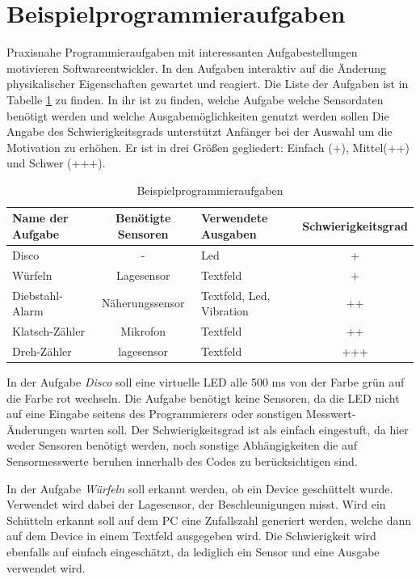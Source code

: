 \documentclass[11pt,a4paper]{report}
\begin{document}
\section{Beispielprogrammieraufgaben}\label{sec:activities}
Praxisnahe Programmieraufgaben mit interessanten Aufgabestellungen motivieren Softwareentwickler.
In den Aufgaben interaktiv auf die Änderung physikalischer Eigenschaften gewartet und reagiert.
Die Liste der Aufgaben ist in Tabelle \ref{tab:excercises} zu finden.
In ihr ist zu finden, welche Aufgabe welche Sensordaten benötigt werden und welche Ausgabemöglichkeiten genutzt werden sollen
Die Angabe des Schwierigkeitsgrads unterstützt Anfänger bei der Auswahl um die Motivation zu erhöhen.
Er ist in drei Größen gegliedert:
Einfach (+), Mittel(++) und Schwer (+++).
\begin{table}[htbp]
  \centering
  \begin{tabular}{|l|c|p{2cm}|c|}
      \hline
      \textbf{Name der Aufgabe} & \textbf{Benötigte Sensoren} & \textbf{Verwendete Ausgaben} & \textbf{Schwierigkeitsgrad} \\
      \hline
      Disco & - & Led & + \\
      \hline
      Würfeln & Lagesensor & Textfeld &+ \\
      \hline
      Diebstahl-Alarm & Näherungssensor & Textfeld, Led, Vibration & ++ \\
      \hline
      Klatsch-Zähler & Mikrofon & Textfeld & ++ \\
      \hline
      Dreh-Zähler & lagesensor & Textfeld & +++ \\
      \hline
  \end{tabular}
  \caption{Beispielprogrammieraufgaben}
  \label{tab:excercises}
\end{table}

In der Aufgabe \textit{Disco} soll eine virtuelle LED alle 500 ms von der Farbe grün auf die Farbe rot wechseln.
Die Aufgabe benötigt keine Sensoren, da die LED nicht auf eine Eingabe seitens des Programmierers oder sonstigen Messwert-Änderungen warten soll.
Der Schwierigkeitsgrad ist als einfach eingestuft, da hier weder Sensoren benötigt werden, noch sonstige Abhängigkeiten die auf Sensormesswerte beruhen innerhalb des Codes zu berücksichtigen sind.

In der Aufgabe \textit{Würfeln} soll erkannt werden, ob ein Device geschüttelt wurde.
Verwendet wird dabei der Lagesensor, der Beschleunigungen misst.
Wird ein Schütteln erkannt soll auf dem PC eine Zufallszahl generiert werden, welche dann auf dem Device in einem Textfeld ausgegeben wird.
Die Schwierigkeit wird ebenfalls auf einfach eingeschätzt, da lediglich ein Sensor und eine Ausgabe verwendet wird.
\end{document}
